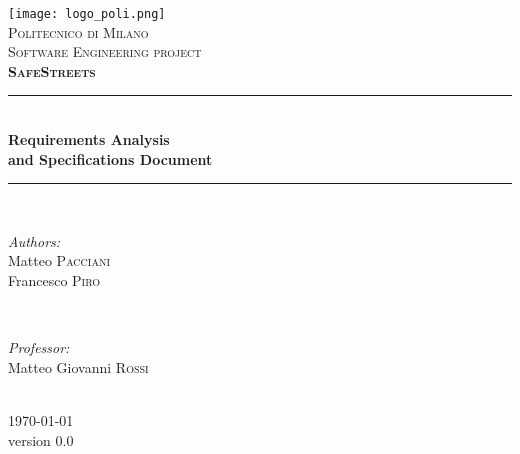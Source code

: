 \begin{titlepage}

	
\newcommand{\HRule}{\rule{\linewidth}{0.5mm}}
\centering

\texttt{[image: logo\_poli.png]}\\[0.5cm]
\textsc{\LARGE Politecnico di Milano}\\[2cm]
\textsc{\Large Software Engineering  project}\\[0.5cm]
\textsc{\LARGE \textbf{SafeStreets}}\\[1.5cm]

\HRule \\[0.4cm]
{ \huge \bfseries Requirements Analysis\\ and Specifications Document}\\[0.4cm] %
\HRule \\[1.5cm]

\begin{minipage}{0.4\textwidth}
	\begin{flushleft} \large
		\emph{Authors:}\\
		Matteo \textsc{Pacciani}\\
		Francesco \textsc{Piro}\\
	\end{flushleft}
\end{minipage}
~
\begin{minipage}{0.4\textwidth}
	\begin{flushright} \large
		\emph{Professor:} \\
		Matteo Giovanni \textsc{Rossi} %
	\end{flushright}
\end{minipage}\\[2cm]

{\large \today}\\[0.5cm] %
{\large version 0.0}\\[2cm]

\vfill
\clearpage

\end{titlepage}